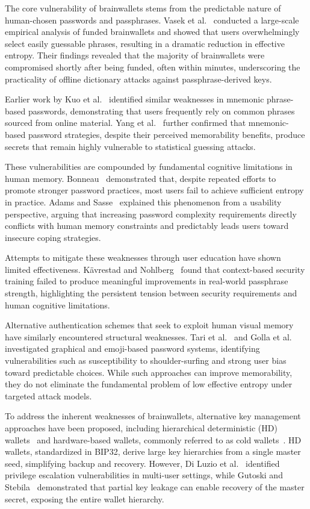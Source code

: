 \documentclass[mathematics,article,accept,pdftex,moreauthors]{Definitions/mdpi}
\begin{document}
The core vulnerability of brainwallets stems from the predictable nature of human-chosen passwords and passphrases. Vasek et al.~\cite{Vasek2017} conducted a large-scale empirical analysis of funded brainwallets and showed that users overwhelmingly select easily guessable phrases, resulting in a dramatic reduction in effective entropy. Their findings revealed that the majority of brainwallets were compromised shortly after being funded, often within minutes, underscoring the practicality of offline dictionary attacks against passphrase-derived keys.

Earlier work by Kuo et al.~\cite{Kuo2006} identified similar weaknesses in mnemonic phrase-based passwords, demonstrating that users frequently rely on common phrases sourced from online material. Yang et al.~\cite{Yang2016} further confirmed that mnemonic-based password strategies, despite their perceived memorability benefits, produce secrets that remain highly vulnerable to statistical guessing attacks.

These vulnerabilities are compounded by fundamental cognitive limitations in human memory. Bonneau~\cite{Bonneau2012} demonstrated that, despite repeated efforts to promote stronger password practices, most users fail to achieve sufficient entropy in practice. Adams and Sasse~\cite{Adams1999, Sasse2001} explained this phenomenon from a usability perspective, arguing that increasing password complexity requirements directly conflicts with human memory constraints and predictably leads users toward insecure coping strategies.

Attempts to mitigate these weaknesses through user education have shown limited effectiveness. Kävrestad and Nohlberg~\cite{Kavrestad2020} found that context-based security training failed to produce meaningful improvements in real-world passphrase strength, highlighting the persistent tension between security requirements and human cognitive limitations.

Alternative authentication schemes that seek to exploit human visual memory have similarly encountered structural weaknesses. Tari et al.~\cite{Tari2006} and Golla et al.~\cite{Golla2017} investigated graphical and emoji-based password systems, identifying vulnerabilities such as susceptibility to shoulder-surfing and strong user bias toward predictable choices. While such approaches can improve memorability, they do not eliminate the fundamental problem of low effective entropy under targeted attack models.

To address the inherent weaknesses of brainwallets, alternative key management approaches have been proposed, including hierarchical deterministic (HD) wallets~\cite{DiLuzio2020, Gutoski2015} and hardware-based wallets, commonly referred to as cold wallets~\cite{Das2019,8726762}. HD wallets, standardized in BIP32, derive large key hierarchies from a single master seed, simplifying backup and recovery. However, Di Luzio et al.~\cite{DiLuzio2020} identified privilege escalation vulnerabilities in multi-user settings, while Gutoski and Stebila~\cite{Gutoski2015} demonstrated that partial key leakage can enable recovery of the master secret, exposing the entire wallet hierarchy.
\end{document}
